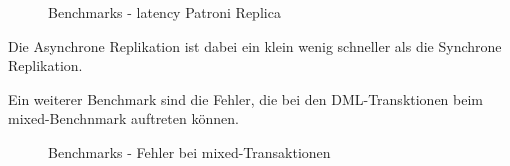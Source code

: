 \begin{flushleft}
\begin{figure}[H]
        \qquad
        \caption{Benchmarks - latency Patroni Replica}
        \label{fig:latency_patroni_replica}
    \end{figure}
    Die Asynchrone Replikation ist dabei ein klein wenig schneller als die Synchrone Replikation.
\end{flushleft}
\begin{flushleft}
    Ein weiterer Benchmark sind die Fehler, die bei den DML-Transktionen beim mixed-Benchnmark auftreten können.
    \begin{figure}[H]
        \centering
        \qquad
        \caption{Benchmarks - Fehler bei mixed-Transaktionen}
        \label{fig:pgbench_errors}
    \end{figure}
\end{flushleft}
